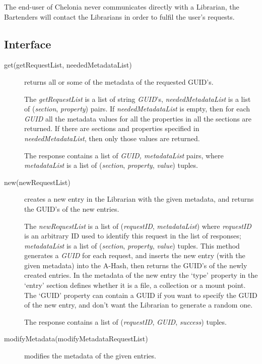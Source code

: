 \documentclass{book}
\begin{document}
The end-user of Chelonia never communicates directly with a Librarian, the Bartenders will contact the Librarians in order to fulfil the user's requests.


\subsection{Interface} %

\begin{description}

    \item [get(getRequestList, neededMetadataList)] returns all or some of the metadata of the requested GUID's.
    
    The \emph{getRequestList} is a list of string \emph{GUID}'s, \emph{neededMetadataList} is a list of (\emph{section}, \emph{property}) pairs. If \emph{neededMetadataList} is empty, then for each \emph{GUID} all the metadata values for all the properties in all the sections are returned. If there are sections and properties specified in \emph{neededMetadataList}, then only those values are returned.

    The response contains a list of \emph{GUID, metadataList} pairs, where \emph{metadataList} is a list of (\emph{section}, \emph{property}, \emph{value}) tuples.

    \item[new(newRequestList)] creates a new entry in the Librarian with the given metadata, and returns the GUID's of the new entries.
    
    The \emph{newRequestList} is a list of (\emph{requestID}, \emph{metadataList}) where \emph{requestID} is an arbitrary ID used to identify this request in the list of responses; \emph{metadataList} is a list of (\emph{section}, \emph{property}, \emph{value}) tuples.
    This method generates a \emph{GUID} for each request, and inserts the new entry (with the given metadata) into the A-Hash, then returns the GUID's of the newly created entries. In the metadata of the new entry the `type' property in the `entry' section defines whether it is a file, a collection or a mount point. The `GUID' property can contain a GUID if you want to specify the GUID of the new entry, and don't want the Librarian to generate a random one.
    
    The response contains a list of (\emph{requestID}, \emph{GUID}, \emph{success}) tuples.
    
    \item[modifyMetadata(modifyMetadataRequestList)] modifies the metadata of the given entries.
    

\end{description}
\end{document}
